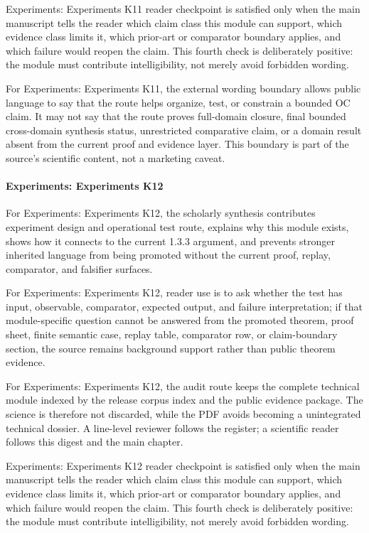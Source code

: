 Experiments: Experiments K11 reader checkpoint is satisfied only when the main manuscript tells the reader which claim class this module can support, which evidence class limits it, which prior-art or comparator boundary applies, and which failure would reopen the claim. This fourth check is deliberately positive: the module must contribute intelligibility, not merely avoid forbidden wording.


For Experiments: Experiments K11, the external wording boundary allows public language to say that the route helps organize, test, or constrain a bounded OC claim. It may not say that the route proves full-domain closure, final bounded cross-domain synthesis status, unrestricted comparative claim, or a domain result absent from the current proof and evidence layer. This boundary is part of the source's scientific content, not a marketing caveat.


\paragraph{Experiments: Experiments K12}

For Experiments: Experiments K12, the scholarly synthesis contributes experiment design and operational test route, explains why this module exists, shows how it connects to the current 1.3.3 argument, and prevents stronger inherited language from being promoted without the current proof, replay, comparator, and falsifier surfaces.


For Experiments: Experiments K12, reader use is to ask whether the test has input, observable, comparator, expected output, and failure interpretation; if that module-specific question cannot be answered from the promoted theorem, proof sheet, finite semantic case, replay table, comparator row, or claim-boundary section, the source remains background support rather than public theorem evidence.


For Experiments: Experiments K12, the audit route keeps the complete technical module indexed by the release corpus index and the public evidence package. The science is therefore not discarded, while the PDF avoids becoming a unintegrated technical dossier. A line-level reviewer follows the register; a scientific reader follows this digest and the main chapter.


Experiments: Experiments K12 reader checkpoint is satisfied only when the main manuscript tells the reader which claim class this module can support, which evidence class limits it, which prior-art or comparator boundary applies, and which failure would reopen the claim. This fourth check is deliberately positive: the module must contribute intelligibility, not merely avoid forbidden wording.


